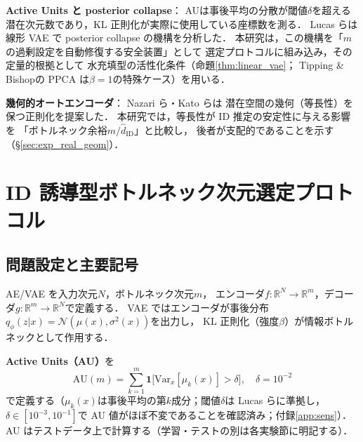 \documentclass[11pt,a4paper]{jsarticle}
\newcommand{\hatdID}{\hat{d}_{\mathrm{ID}}}
\newcommand{\R}{\mathbb{R}}
\begin{document}
\textbf{Active Units と posterior collapse}：
AU\cite{higgins2017betavae,lucas2019elbo}は事後平均の分散が閾値$\delta$を超える
潜在次元数であり，KL 正則化が実際に使用している座標数を測る．
Lucas ら\cite{lucas2019elbo}は線形 VAE で posterior collapse の機構を分析した．
本研究は，この機構を「$m$の過剰設定を自動修復する安全装置」として
選定プロトコルに組み込み，その定量的根拠として
水充填型の活性化条件（命題\ref{thm:linear_vae}；
Tipping \& Bishop\cite{tippingbishop1999ppca}の PPCA は$\beta=1$の特殊ケース）を用いる．

\textbf{幾何的オートエンコーダ}：
Nazari ら\cite{nazari2023geometric}・Kato ら\cite{kato2020rdae}は
潜在空間の幾何（等長性）を保つ正則化を提案した．
本研究では，等長性が ID 推定の安定性に与える影響を
「ボトルネック余裕$m / \hatdID$」と比較し，
後者が支配的であることを示す（§\ref{sec:exp_real_geom}）．

\section{ID 誘導型ボトルネック次元選定プロトコル}\label{sec:protocol}

\subsection{問題設定と主要記号}\label{sec:protocol_setup}

AE/VAE を入力次元$N$，ボトルネック次元$m$，
エンコーダ$f: \R^N \to \R^m$，デコーダ$g: \R^m \to \R^N$で定義する．
VAE ではエンコーダが事後分布$q_\phi(z|x) = \mathcal{N}(\mu(x), \sigma^2(x))$を出力し，
KL 正則化（強度$\beta$）が情報ボトルネックとして作用する．

\textbf{Active Units（AU）}を
\begin{equation}
  \mathrm{AU}(m) = \sum_{k=1}^{m} \mathbf{1}\bigl[\mathrm{Var}_x[\mu_k(x)] > \delta\bigr],
  \quad \delta = 10^{-2}
  \label{eq:au_def}
\end{equation}
で定義する（$\mu_k(x)$は事後平均の第$k$成分；閾値$\delta$は
Lucas ら\cite{lucas2019elbo}に準拠し，$\delta \in [10^{-3}, 10^{-1}]$で
AU 値がほぼ不変であることを確認済み；付録\ref{app:sens}）．
AU はテストデータ上で計算する（学習・テストの別は各実験節に明記する）．
\end{document}
